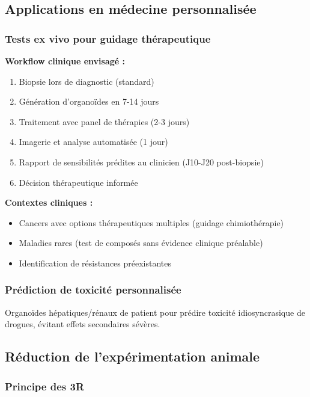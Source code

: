 \subsection{Applications en médecine personnalisée}

\subsubsection{Tests ex vivo pour guidage thérapeutique}

\textbf{Workflow clinique envisagé :}
\begin{enumerate}
    \item Biopsie lors de diagnostic (standard)
    \item Génération d'organoïdes en 7-14 jours
    \item Traitement avec panel de thérapies (2-3 jours)
    \item Imagerie et analyse automatisée (1 jour)
    \item Rapport de sensibilités prédites au clinicien (J10-J20 post-biopsie)
    \item Décision thérapeutique informée
\end{enumerate}

\textbf{Contextes cliniques :}
\begin{itemize}
    \item Cancers avec options thérapeutiques multiples (guidage chimiothérapie)
    \item Maladies rares (test de composés sans évidence clinique préalable)
    \item Identification de résistances préexistantes
\end{itemize}

\subsubsection{Prédiction de toxicité personnalisée}

Organoïdes hépatiques/rénaux de patient pour prédire toxicité idiosyncrasique de drogues, évitant effets secondaires sévères.

\subsection{Réduction de l'expérimentation animale}

\subsubsection{Principe des 3R}

